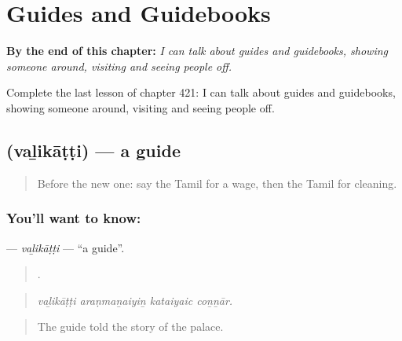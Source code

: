 
\chapter{Guides and Guidebooks}
\label{ch:ta-guides-and-guidebooks}

\begin{chapteropening}
\textbf{By the end of this chapter:} \emph{I can talk about guides and guidebooks, showing someone around, visiting and seeing people off.}

Complete the last lesson of chapter 421: I can talk about guides and guidebooks, showing someone around, visiting and seeing people off.
\end{chapteropening}

\section[\texorpdfstring{\ta{வழிகாட்டி} (vaḻikāṭṭi)}{வழிகாட்டி (vaḻikāṭṭi)}]{ (vaḻikāṭṭi) — a guide}

\label{lesson:TA-C421-valikatti}



\begin{quote}
Before the new one: say the Tamil for a wage, then the Tamil for cleaning.
\end{quote}

\subsection*{You'll want to know: }
\textbf{} — \emph{vaḻikāṭṭi} — \textquotedblleft{}a guide\textquotedblright{}.

\begin{quote}
   .
\end{quote}

\begin{quote}
\emph{vaḻikāṭṭi araṇmaṉaiyiṉ kataiyaic coṉṉār.}
\end{quote}

\begin{quote}
The guide told the story of the palace.
\end{quote}


